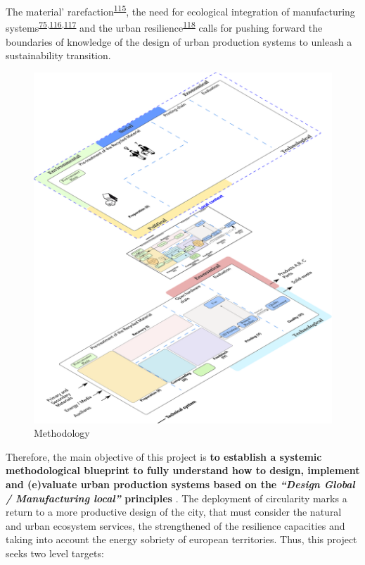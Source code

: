 \documentclass[
  12pt,
  a4paperpaper,
  onecolumn]{article}
\begin{document}
The material'
rarefaction\textsuperscript{\protect\hyperlink{ref-hultman2021}{115}},
the need for ecological integration of manufacturing
systems\textsuperscript{\protect\hyperlink{ref-Bakshi2019a}{75},\protect\hyperlink{ref-Bakshi2015}{116},\protect\hyperlink{ref-Saladini2018}{117}}
and the urban
resilience\textsuperscript{\protect\hyperlink{ref-xu2021e}{118}} calls
for pushing forward the boundaries of knowledge of the design of urban
production systems to unleash a sustainability transition.

\begin{figure}
\centering
    \includegraphics[width=\linewidth]{Figures/Levels.png}
    \caption{Methodology}
    \label{fig:levels}
\end{figure}

Therefore, the main objective of this project is \textbf{to establish a
systemic methodological blueprint to fully understand how to design,
implement and (e)valuate urban production systems based on the
\emph{``Design Global / Manufacturing local''} principles }. The
deployment of circularity marks a return to a more productive design of
the city, that must consider the natural and urban ecosystem services,
the strengthened of the resilience capacities and taking into account
the energy sobriety of european territories. Thus, this project seeks
two level targets:
\end{document}
